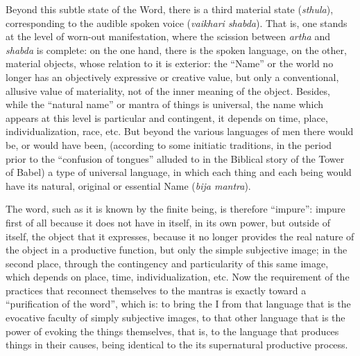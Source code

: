 Beyond this subtle state of the Word, there is a third material state (\textit{sthula}), corresponding to the audible spoken voice (\textit{vaikhari shabda}). That is, one stands at the level of worn-out manifestation, where the scission between \textit{artha} and \textit{shabda} is complete: on the one hand, there is the spoken language, on the other, material objects, whose relation to it is exterior: the “Name” or the world no longer has an objectively expressive or creative value, but only a conventional, allusive value of materiality, not of the inner meaning of the object. Besides, while the “natural name” or mantra of things is universal, the name which appears at this level is particular and contingent, it depends on time, place, individualization, race, etc. But beyond the various languages of men there would be, or would have been, (according to some initiatic traditions, in the period prior to the “confusion of tongues” alluded to in the Biblical story of the Tower of Babel) a type of universal language, in which each thing and each being would have its natural, original or essential Name (\textit{bija mantra}).

The word, such as it is known by the finite being, is therefore “impure”: impure first of all because it does not have in itself, in its own power, but outside of itself, the object that it expresses, because it no longer provides the real nature of the object in a productive function, but only the simple subjective image; in the second place, through the contingency and particularity of this same image, which depends on place, time, individualization, etc. Now the requirement of the practices that reconnect themselves to the mantras is exactly toward a “purification of the word”, which is: to bring the I from that language that is the evocative faculty of simply subjective images, to that other language that is the power of evoking the things themselves, that is, to the language that produces things in their causes, being identical to the its supernatural productive process.

